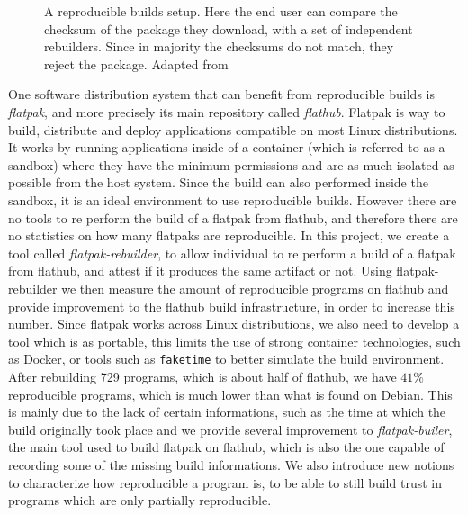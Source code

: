 \documentclass[a4paper,11pt,oneside]{report}
\theoremstyle{definition}
\newcommand{\sysname}{flatpak-rebuilder\xspace}
\newcommand{\rb}{reproducible builds\xspace}
\newcommand{\fp}{flatpak\xspace}
\newcommand{\Fp}{Flatpak\xspace}
\newcommand{\fh}{flathub\xspace}
\newcommand{\fb}{flatpak-builer\xspace}
\begin{document}
\begin{figure}[h]
    \caption{A reproducible builds setup. Here the end user can compare the
    checksum of the package they download, with a set of independent
    rebuilders. Since in majority the checksums do not match, they reject the
    package. Adapted from \cite{DBLP:journals/corr/abs-2104-06020}}
    \label{fig:reprobuild}
\end{figure}

One software distribution system that can benefit from \rb is \emph{\fp}, and
more precisely its main repository called \emph{\fh}. \Fp is way to build,
distribute and deploy applications compatible on most Linux distributions. It
works by running applications inside of a container (which is referred to as a
sandbox) where they have the minimum permissions and are as much isolated as
possible from the host system. Since the build can also performed inside the
sandbox, it is an ideal environment to use \rb. However there are no tools to
re perform the build of a \fp from \fh, and therefore there are no statistics
on how many flatpaks are reproducible. In this project, we create a tool called
\emph{\sysname}, to allow individual to re perform a build of a \fp from \fh,
and attest if it produces the same artifact or not. Using \sysname we then
measure the amount of reproducible programs on \fh and provide improvement to
the \fh build infrastructure, in order to increase this number. Since \fp works
across Linux distributions, we also need to develop a tool which is as
portable, this limits the use of strong container technologies, such as Docker,
or tools such as \verb|faketime| to better simulate the build environment.
After rebuilding 729 programs, which is about half of \fh, we have $41\%$
reproducible programs, which is much lower than what is found on Debian. This
is mainly due to the lack of certain informations, such as the time at which
the build originally took place and we provide several improvement to
\emph{\fb}, the main tool used to build \fp on \fh, which is also the one
capable of recording some of the missing build informations. We also introduce
new notions to characterize how reproducible a program is, to be able to still
build trust in programs which are only partially reproducible.
\end{document}
